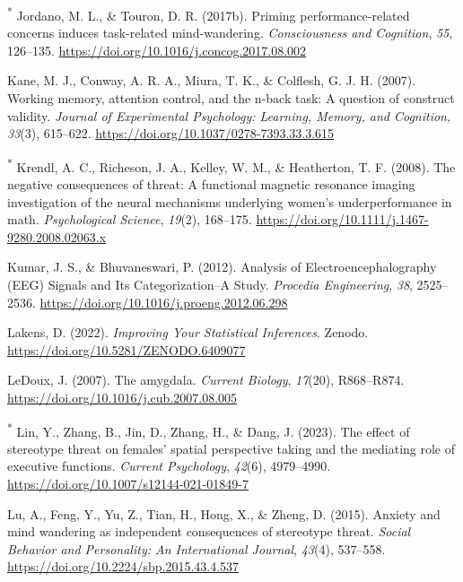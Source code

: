 \documentclass[
  stu, a4paper, 12pt,mask,floatsintext]{apa7}
\newlength{\cslhangindent}
\newenvironment{CSLReferences}[2] %
 {\begin{list}{}{%
  \setlength{\itemindent}{0pt}
  \setlength{\leftmargin}{0pt}
  \setlength{\parsep}{0pt}
  \ifodd #1
   \setlength{\leftmargin}{\cslhangindent}
   \setlength{\itemindent}{-1\cslhangindent}
  \fi
  \setlength{\itemsep}{#2\baselineskip}}}
 {\end{list}}
\begin{document}
\begin{CSLReferences}{1}{0}
\textsuperscript{*} Jordano, M. L., \& Touron, D. R. (2017b). Priming performance-related concerns induces task-related mind-wandering. \emph{Consciousness and Cognition}, \emph{55}, 126--135. \url{https://doi.org/10.1016/j.concog.2017.08.002}

Kane, M. J., Conway, A. R. A., Miura, T. K., \& Colflesh, G. J. H. (2007). Working memory, attention control, and the n-back task: {A} question of construct validity. \emph{Journal of Experimental Psychology: Learning, Memory, and Cognition}, \emph{33}(3), 615--622. \url{https://doi.org/10.1037/0278-7393.33.3.615}

\textsuperscript{*} Krendl, A. C., Richeson, J. A., Kelley, W. M., \& Heatherton, T. F. (2008). The negative consequences of threat: A functional magnetic resonance imaging investigation of the neural mechanisms underlying women's underperformance in math. \emph{Psychological Science}, \emph{19}(2), 168--175. \url{https://doi.org/10.1111/j.1467-9280.2008.02063.x}

Kumar, J. S., \& Bhuvaneswari, P. (2012). Analysis of {Electroencephalography} ({EEG}) {Signals} and {Its Categorization}--{A Study}. \emph{Procedia Engineering}, \emph{38}, 2525--2536. \url{https://doi.org/10.1016/j.proeng.2012.06.298}

Lakens, D. (2022). \emph{Improving {Your Statistical Inferences}}. Zenodo. \url{https://doi.org/10.5281/ZENODO.6409077}

LeDoux, J. (2007). The amygdala. \emph{Current Biology}, \emph{17}(20), R868--R874. \url{https://doi.org/10.1016/j.cub.2007.08.005}

\textsuperscript{*} Lin, Y., Zhang, B., Jin, D., Zhang, H., \& Dang, J. (2023). The effect of stereotype threat on females' spatial perspective taking and the mediating role of executive functions. \emph{Current Psychology}, \emph{42}(6), 4979--4990. \url{https://doi.org/10.1007/s12144-021-01849-7}

Lu, A., Feng, Y., Yu, Z., Tian, H., Hong, X., \& Zheng, D. (2015). Anxiety and mind wandering as independent consequences of stereotype threat. \emph{Social Behavior and Personality: An International Journal}, \emph{43}(4), 537--558. \url{https://doi.org/10.2224/sbp.2015.43.4.537}


\end{CSLReferences}
\end{document}
